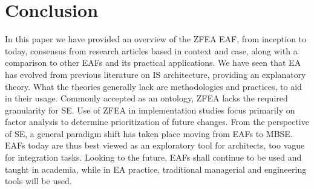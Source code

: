 \documentclass[12pt,conference]{IEEEtran}
\begin{document}
\section{Conclusion}
In this paper we have provided an overview of the ZFEA EAF, from inception to today, consensus from research articles based in context and case, along with a comparison to other EAFs and its practical applications.
We have seen that EA has evolved from previous literature on IS architecture, providing an explanatory theory.
What the theories generally lack are methodologies and practices, to aid in their usage.
Commonly accepted as an ontology, ZFEA lacks the required granularity for SE.
Use of ZFEA in implementation studies focus primarily on factor analysis to determine prioritization of future changes.
From the perspective of SE, a general paradigm shift has taken place moving from EAFs to MBSE.
EAFs today are thus best viewed as an exploratory tool for architects, too vague for integration tasks.
Looking to the future, EAFs shall continue to be used and taught in academia, while in EA practice, traditional managerial and engineering tools will be used.



% 
\end{document}
